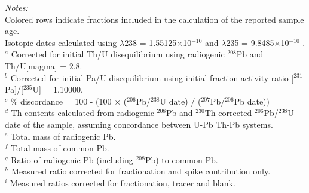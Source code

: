 \begin{table}
\flushleft \emph{Notes:} \\
Colored rows indicate fractions included in the calculation of the reported sample age. \\
Isotopic dates calculated using $\lambda$238 = 1.55125$\times$10$^{-10}$ and $\lambda$235 = 9.8485$\times$10$^{-10}$ \citep{Jaffey1971a}. \\
 $^{a}$  Corrected for initial Th/U disequilibrium using radiogenic $^{208}$Pb and Th/U[magma] = 2.8. \\
 $^{b}$ Corrected for initial Pa/U disequilibrium using initial fraction activity ratio [$^{231}$Pa]/[$^{235}$U] = 1.10000. \\
 $^{c}$ \% discordance = 100 - (100 $\times$ ($^{206}$Pb/$^{238}$U date) / ($^{207}$Pb/$^{206}$Pb date)) \\
 $^{d}$ Th contents calculated from radiogenic $^{208}$Pb and $^{230}$Th-corrected $^{206}$Pb/$^{238}$U date of the sample, assuming concordance between U-Pb Th-Pb systems. \\
 $^{e}$ Total mass of radiogenic Pb. \\
 $^{f}$ Total mass of common Pb. \\
 $^{g}$ Ratio of radiogenic Pb (including $^{208}$Pb) to common Pb. \\
 $^{h}$ Measured ratio corrected for fractionation and spike contribution only. \\
 $^{i}$ Measured ratios corrected for fractionation, tracer and blank.
\end{table}

